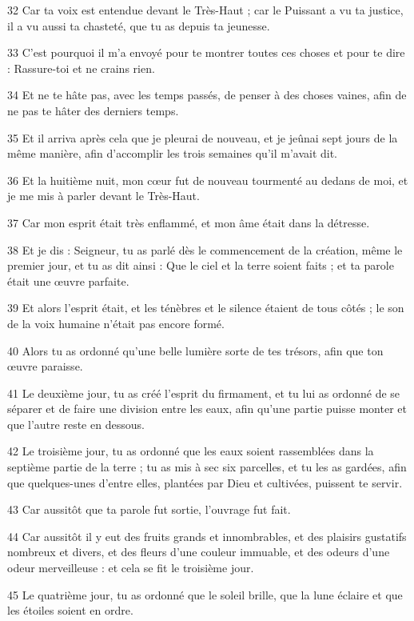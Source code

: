 \par 32 Car ta voix est entendue devant le Très-Haut ; car le Puissant a vu ta justice, il a vu aussi ta chasteté, que tu as depuis ta jeunesse.
\par 33 C'est pourquoi il m'a envoyé pour te montrer toutes ces choses et pour te dire : Rassure-toi et ne crains rien.
\par 34 Et ne te hâte pas, avec les temps passés, de penser à des choses vaines, afin de ne pas te hâter des derniers temps.
\par 35 Et il arriva après cela que je pleurai de nouveau, et je jeûnai sept jours de la même manière, afin d'accomplir les trois semaines qu'il m'avait dit.
\par 36 Et la huitième nuit, mon cœur fut de nouveau tourmenté au dedans de moi, et je me mis à parler devant le Très-Haut.
\par 37 Car mon esprit était très enflammé, et mon âme était dans la détresse.
\par 38 Et je dis : Seigneur, tu as parlé dès le commencement de la création, même le premier jour, et tu as dit ainsi : Que le ciel et la terre soient faits ; et ta parole était une œuvre parfaite.
\par 39 Et alors l'esprit était, et les ténèbres et le silence étaient de tous côtés ; le son de la voix humaine n’était pas encore formé.
\par 40 Alors tu as ordonné qu'une belle lumière sorte de tes trésors, afin que ton œuvre paraisse.
\par 41 Le deuxième jour, tu as créé l'esprit du firmament, et tu lui as ordonné de se séparer et de faire une division entre les eaux, afin qu'une partie puisse monter et que l'autre reste en dessous.
\par 42 Le troisième jour, tu as ordonné que les eaux soient rassemblées dans la septième partie de la terre ; tu as mis à sec six parcelles, et tu les as gardées, afin que quelques-unes d'entre elles, plantées par Dieu et cultivées, puissent te servir.
\par 43 Car aussitôt que ta parole fut sortie, l'ouvrage fut fait.
\par 44 Car aussitôt il y eut des fruits grands et innombrables, et des plaisirs gustatifs nombreux et divers, et des fleurs d'une couleur immuable, et des odeurs d'une odeur merveilleuse : et cela se fit le troisième jour.
\par 45 Le quatrième jour, tu as ordonné que le soleil brille, que la lune éclaire et que les étoiles soient en ordre.
